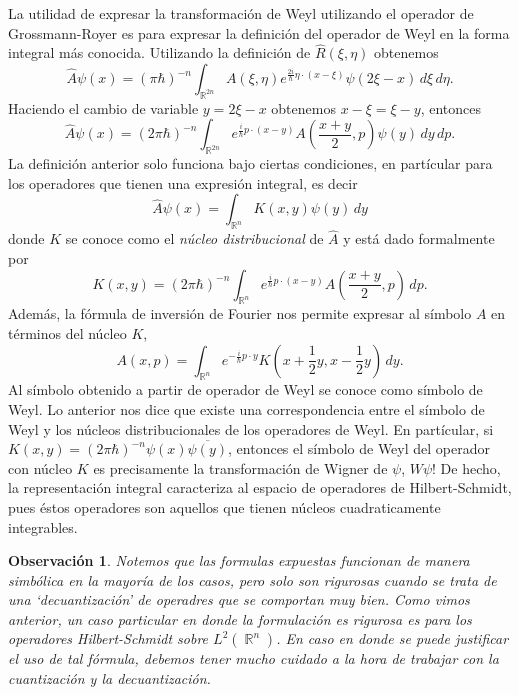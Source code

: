 \documentclass[a4paper]{report}
\DeclareMathOperator{\R}{\mathbb{R}}
\newtheorem{remark}{Observación}
\begin{document}
  La utilidad de expresar la transformación de Weyl
  utilizando el operador de Grossmann-Royer es para expresar
  la definición del operador de Weyl en la forma integral
  más conocida. Utilizando la definición de
  $\hat{R}(\xi,\eta)$ obtenemos
  \[
    \hat{A}\psi(x)
    = (\pi\hbar)^{-n} \int_{\R^{2n}} A(\xi,\eta)
    e^{\frac{2i}{\hbar} \eta \cdot (x - \xi)} \psi(2\xi - x)
    \, d\xi \, d\eta.
  \] 
  Haciendo el cambio de variable $y = 2\xi - x$ obtenemos $x
  - \xi = \xi - y$, entonces
  \begin{equation}
    \label{eqn:weyl_quant_k}
    \hat{A}\psi(x)
    = (2\pi\hbar)^{-n} \int_{\R^{2n}} e^{\frac{i}{\hbar} p
    \cdot (x - y)} A\left( \frac{x+y}{2}, p \right) \psi(y)
    \, dy \, dp.
  \end{equation}
  La definición anterior solo funciona bajo ciertas
  condiciones, en partícular para los operadores que tienen
  una expresión integral, es decir
  \[
    \hat{A}\psi(x) = \int_{\R^{n}} K(x,y) \psi(y) \, dy
  \] 
  donde $K$ se conoce como el \textit{núcleo distribucional}
  de $\hat{A}$ y está dado formalmente por
  \begin{equation}
    K(x,y)
    = (2\pi\hbar)^{-n} \int_{\R^{n}} e^{\frac{i}{\hbar} p
    \cdot (x - y)}A\left( \frac{x+y}{2}, p \right) \, dp.
  \end{equation}
  Además, la fórmula de inversión de Fourier nos permite
  expresar al símbolo $A$ en términos del núcleo $K$,
  \begin{equation}
    A(x,p)
    = \int_{\R^{n}} e^{-\frac{i}{\hbar} p \cdot y} K\left( x
    + \frac{1}{2}y, x - \frac{1}{2}y\right) \, dy.
  \end{equation}
  Al símbolo obtenido a partir de operador de Weyl se conoce
  como símbolo de Weyl.  Lo anterior nos dice que existe una
  correspondencia entre el símbolo de Weyl y los núcleos
  distribucionales de los operadores de Weyl. En partícular,
  si $K(x,y) = (2\pi\hbar)^{-n} \psi(x)\overline{\psi(y)}$,
  entonces el símbolo de Weyl del operador con núcleo $K$ es
  precisamente la transformación de Wigner de $\psi$,
  $W\psi$! De hecho, la representación integral caracteriza
  al espacio de operadores de Hilbert-Schmidt, pues éstos
  operadores son aquellos que tienen núcleos cuadraticamente
  integrables.

  \begin{remark}
    Notemos que las formulas expuestas funcionan de manera
    simbólica en la mayoría de los casos, pero solo son
    rigurosas cuando se trata de una `decuantización' de
    operadres que se comportan muy bien. Como vimos
    anterior, un caso particular en donde la formulación es
    rigurosa es para los operadores Hilbert-Schmidt sobre
    $L^2(\R^{n})$. En caso en donde se puede justificar el
    uso de tal fórmula, debemos tener mucho cuidado a la
    hora de trabajar con la cuantización y la
    decuantización. 
  \end{remark}
\end{document}
